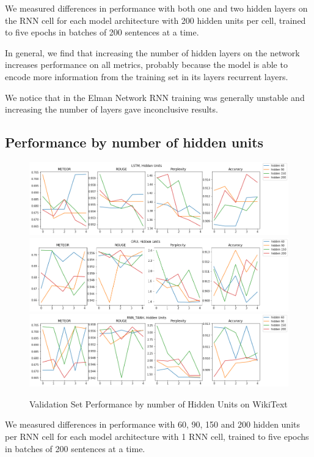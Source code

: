 \documentclass[a4paper]{article}
\begin{document}
We measured differences in performance with both one and two hidden layers
on the RNN cell for each model architecture with 200 hidden units per cell, trained
to five epochs in batches of 200 sentences at a time.

In general, we find that increasing the number of hidden layers on the network
increases performance on all metrics, probably because the model is able to
encode more information from the training set in its layers recurrent layers.

We notice that in the Elman Network RNN training was generally unstable and
increasing the number of layers gave inconclusive results.

\subsection{Performance by number of hidden units}
\label{sec:perf_by_n_hidden}

\begin{figure}[!ht]
\includegraphics[width=0.8\columnwidth]{sr-perf-by-hidden-units-lstm}
\includegraphics[width=0.8\columnwidth]{sr-perf-by-hidden-units-gru}
\includegraphics[width=0.8\columnwidth]{sr-perf-by-hidden-units-rnn}
\centering
\caption{Validation Set Performance by number of Hidden Units on WikiText}
\end{figure}

We measured differences in performance with 60, 90, 150 and 200 hidden units per
RNN cell for each model architecture with 1 RNN cell, trained
to five epochs in batches of 200 sentences at a time.
\end{document}
